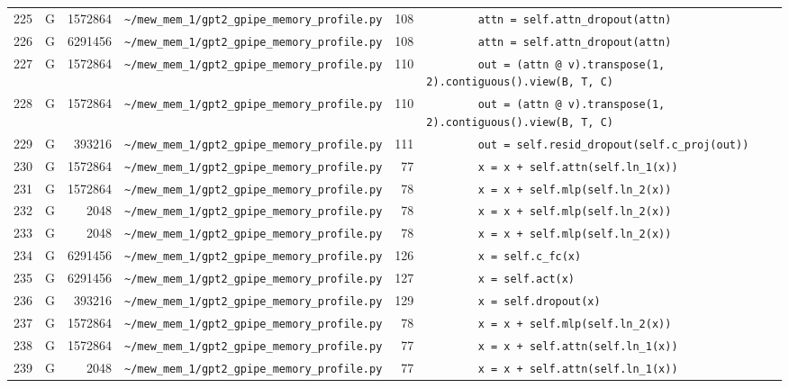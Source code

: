 \documentclass{article}
\begin{document}
\begin{longtable}{r l r p{6.5cm} r p{7.0cm}}
225 & G & 1572864 & \lstinline|~/mew_mem_1/gpt2_gpipe_memory_profile.py| & 108 & \lstinline|        attn = self.attn_dropout(attn)| \\
226 & G & 6291456 & \lstinline|~/mew_mem_1/gpt2_gpipe_memory_profile.py| & 108 & \lstinline|        attn = self.attn_dropout(attn)| \\
227 & G & 1572864 & \lstinline|~/mew_mem_1/gpt2_gpipe_memory_profile.py| & 110 & \lstinline|        out = (attn @ v).transpose(1, 2).contiguous().view(B, T, C)| \\
228 & G & 1572864 & \lstinline|~/mew_mem_1/gpt2_gpipe_memory_profile.py| & 110 & \lstinline|        out = (attn @ v).transpose(1, 2).contiguous().view(B, T, C)| \\
229 & G & 393216 & \lstinline|~/mew_mem_1/gpt2_gpipe_memory_profile.py| & 111 & \lstinline|        out = self.resid_dropout(self.c_proj(out))| \\
230 & G & 1572864 & \lstinline|~/mew_mem_1/gpt2_gpipe_memory_profile.py| & 77 & \lstinline|        x = x + self.attn(self.ln_1(x))| \\
231 & G & 1572864 & \lstinline|~/mew_mem_1/gpt2_gpipe_memory_profile.py| & 78 & \lstinline|        x = x + self.mlp(self.ln_2(x))| \\
232 & G & 2048 & \lstinline|~/mew_mem_1/gpt2_gpipe_memory_profile.py| & 78 & \lstinline|        x = x + self.mlp(self.ln_2(x))| \\
233 & G & 2048 & \lstinline|~/mew_mem_1/gpt2_gpipe_memory_profile.py| & 78 & \lstinline|        x = x + self.mlp(self.ln_2(x))| \\
234 & G & 6291456 & \lstinline|~/mew_mem_1/gpt2_gpipe_memory_profile.py| & 126 & \lstinline|        x = self.c_fc(x)| \\
235 & G & 6291456 & \lstinline|~/mew_mem_1/gpt2_gpipe_memory_profile.py| & 127 & \lstinline|        x = self.act(x)| \\
236 & G & 393216 & \lstinline|~/mew_mem_1/gpt2_gpipe_memory_profile.py| & 129 & \lstinline|        x = self.dropout(x)| \\
237 & G & 1572864 & \lstinline|~/mew_mem_1/gpt2_gpipe_memory_profile.py| & 78 & \lstinline|        x = x + self.mlp(self.ln_2(x))| \\
238 & G & 1572864 & \lstinline|~/mew_mem_1/gpt2_gpipe_memory_profile.py| & 77 & \lstinline|        x = x + self.attn(self.ln_1(x))| \\
239 & G & 2048 & \lstinline|~/mew_mem_1/gpt2_gpipe_memory_profile.py| & 77 & \lstinline|        x = x + self.attn(self.ln_1(x))| \\

\end{longtable}
\end{document}
